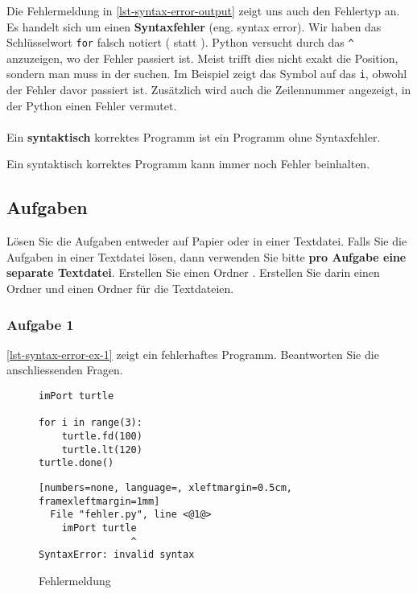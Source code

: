 Die Fehlermeldung in \autoref{lst-syntax-error-output} zeigt uns auch den Fehlertyp an. Es handelt sich um einen \textbf{Syntaxfehler} (eng. syntax error). Wir haben das Schlüsselwort \lstinline{for} falsch notiert ( statt ). Python versucht durch das \lstinline{^} anzuzeigen, wo der Fehler passiert ist. Meist trifft dies nicht exakt die Position, sondern man muss in der  suchen. Im Beispiel zeigt das Symbol auf das \lstinline{i}, obwohl der Fehler davor passiert ist. Zusätzlich wird auch die Zeilennummer angezeigt, in der Python einen Fehler vermutet.\\
\\
Ein \textbf{syntaktisch} korrektes Programm ist ein Programm ohne Syntaxfehler.

\begin{important}
Ein syntaktisch korrektes Programm kann immer noch Fehler beinhalten.
\end{important}

\subsection{Aufgaben}

Lösen Sie die Aufgaben entweder auf Papier oder in einer Textdatei. Falls Sie die Aufgaben in einer Textdatei lösen, dann verwenden Sie bitte \textbf{pro Aufgabe eine separate Textdatei}. Erstellen Sie einen Ordner . Erstellen Sie darin einen Ordner  und einen Ordner  für die Textdateien.

\subsubsection{Aufgabe 1}

\autoref{lst-syntax-error-ex-1} zeigt ein fehlerhaftes Programm. Beantworten Sie die anschliessenden Fragen.

\begin{figure}[htb]
\centering
\begin{minipage}{0.35\linewidth}
\centering
\begin{lstlisting}[caption={Das Programm hat einen Syntaxfehler.}, label=lst-syntax-error-ex-1, showstringspaces=false]
imPort turtle

for i in range(3):
    turtle.fd(100)
    turtle.lt(120)
turtle.done()
\end{lstlisting}
\end{minipage}
\hfill
\begin{minipage}{0.6\linewidth}
\centering
\begin{lstlisting}[numbers=none, language=, xleftmargin=0.5cm, framexleftmargin=1mm]
  File "fehler.py", line <@1@>
    imPort turtle
                ^
SyntaxError: invalid syntax
\end{lstlisting}
\caption{Fehlermeldung}
\label{lst-syntax-error-ex-1-output}
\end{minipage}
\end{figure}

